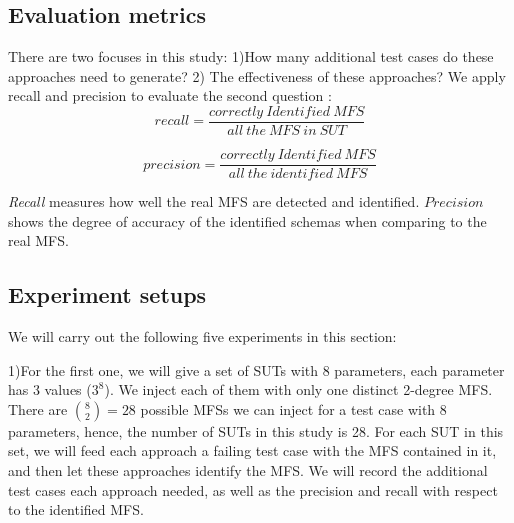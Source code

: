 \documentclass{sig-alternate-05-2015}
\begin{document}
{{\begin{table}
\end{table}


\subsection{Evaluation metrics}
There are two focuses in this study: 1)How many additional test cases do these approaches need to generate? 2) The effectiveness of these approaches?  We apply recall and precision to evaluate the second question :
$$recall =
 \frac{correctly\ Identified\ MFS}{all\ the\ MFS\ in\ SUT}
$$

$$precision =
 \frac{correctly\ Identified\ MFS}{all\ the\ identified\ MFS}
$$

\emph{Recall} measures how well the real MFS are detected and identified. $Precision$ shows the degree of accuracy of the identified schemas when comparing to the real MFS.

%


\subsection{Experiment setups}
We will carry out the following five experiments in this section:

1)For the first one, we will give a set of SUTs with 8 parameters, each parameter has 3 values ($3^8$). We inject each of them with only one distinct 2-degree MFS. There are $\binom{8}{2} = 28$ possible MFSs we can inject for a test case with 8 parameters, hence, the number of SUTs in this study is 28. For each SUT in this set, we will feed each approach a failing test case with the MFS contained in it, and then let these approaches identify the MFS. We will record the additional test cases each approach needed, as well as the precision and recall with respect to the identified MFS.

}}
\end{document}
